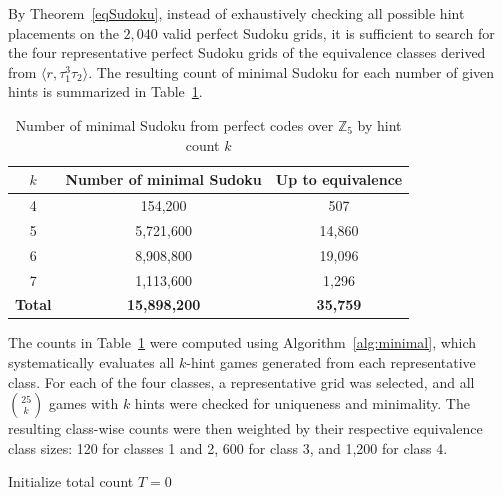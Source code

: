 \documentclass{article}
\theoremstyle{definition}
\begin{document}
By Theorem~\ref{eqSudoku}, instead of exhaustively checking all possible hint placements on the $2{,}040$ valid perfect Sudoku grids, it is sufficient to search for the four representative perfect Sudoku grids of the equivalence classes derived from $\langle r, \tau_1^3\tau_2\rangle$. The resulting count of minimal Sudoku for each number of given hints is summarized in Table~\ref{tab:minimal-Sudoku-counts}.

\begin{table}[ht]
\renewcommand{\arraystretch}{1.4}
\centering
\begin{tabular}{|c|c|c|}
\hline
\textbf{$k$} & \textbf{Number of minimal Sudoku} & \textbf{Up to equivalence} \\
\hline
4 & 154,200     & 507    \\
5 & 5,721,600 & 14,860 \\
6 & 8,908,800 & 19,096 \\
7 & 1,113,600 & 1,296  \\
\hline
\textbf{Total} & \textbf{15,898,200} & \textbf{35,759} \\
\hline
\end{tabular}
\caption{Number of minimal Sudoku from perfect codes over $\mathbb{Z}_5$ by hint count $k$}
\label{tab:minimal-Sudoku-counts}
\end{table}

The counts in Table~\ref{tab:minimal-Sudoku-counts} were computed using Algorithm~\ref{alg:minimal}, which systematically evaluates all \(k\)-hint games generated from each representative class. For each of the four classes, a representative grid was selected, and all \(\binom{25}{k}\) games with \(k\) hints were checked for uniqueness and minimality. The resulting class-wise counts were then weighted by their respective equivalence class sizes: 120 for classes 1 and 2, 600 for class 3, and 1,200 for class 4.


\begin{algorithm}
\caption{Number of minimal Sudoku by hint count \(k\)}\label{alg:minimal}

Initialize total count \(T = 0\)

\end{algorithm}
\end{document}
